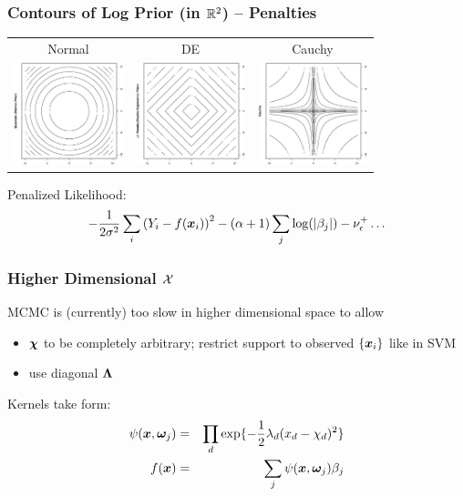 \documentclass[]{beamer}\usepackage[]{graphicx}\usepackage[]{color}
\newcommand{\bs}[2]{\begin{frame} \frametitle{#1}
{#2}
\end{frame} }
\begin{document}
\bs{Contours of Log Prior (in $\mathbb{R}^2$) -- Penalties} {
\begin{tabular}{ccc}
Normal  & DE  & Cauchy \\
\includegraphics[angle=270,width=1.25in]{L2.ps} &
\includegraphics[angle=270,width=1.25in]{L1.ps} &
\includegraphics[angle=270,width=1.25in]{cauchy.ps}
\end{tabular}

\vspace{.25in}
Penalized Likelihood:
$$-\frac{1}{2 \sigma^2} \sum_i\left(Y_i - f(\bm x_i)\right)^2  - (\alpha +
1) \sum_j
\log(|\beta_j|)  - \nu^+_{\epsilon} \ldots $$

}





\bs{Higher Dimensional $\mathcal{X}$} {

MCMC is (currently) too slow in higher dimensional space to allow \pause
\begin{itemize}
\item $\bm \chi$ to be completely arbitrary; restrict support to
  observed $\{\bm x_i\}$ like in SVM \pause
\item use diagonal $\bm \Lambda$
\end{itemize}
Kernels take form:
\begin{eqnarray*}
\psi(\bm x, \bm \omega_j) & = & \prod_d \exp\{ -\frac{1}{2} \lambda_d (x_d - \chi_{d})^2
\} \\
f(\bm x) & =  & \sum_j \psi(\bm x, \bm \omega_j) \beta_j
\end{eqnarray*}
}
\end{document}

